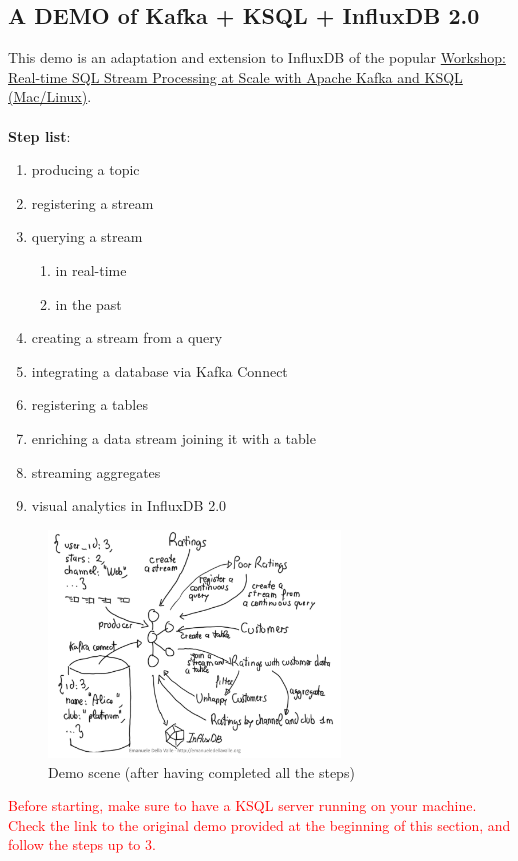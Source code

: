 \documentclass[10pt,a4paper]{article}
\newcommand{\nline}{\\~\\}
\begin{document}
\subsection{A DEMO of
Kafka + KSQL + InfluxDB 2.0}
This demo is an adaptation and extension to InfluxDB of the popular
\href{https://github.com/confluentinc/demo-scene/blob/master/ksql-workshop/ksql-workshop.adoc}{Workshop: Real-time SQL Stream Processing at Scale with
Apache Kafka and KSQL (Mac/Linux)}.
\nline
\textbf{Step list}:
\begin{enumerate}
    \item producing a topic
    \item registering a stream
    \item querying a stream
    \begin{enumerate}
         \item in real-time
         \item in the past
    \end{enumerate}     
    \item creating a stream from a query
    \item integrating a database via Kafka Connect
    \item registering a tables
    \item enriching a data stream joining it with a table
    \item streaming aggregates
    \item visual analytics in InfluxDB 2.0
\end{enumerate}
  \begin{figure}[ht!]
 \hfill \includegraphics[width=220pt]{images/ksql-demo-scene}\hspace*{\fill}
 \caption{Demo scene (after having completed all the steps)}
 \end{figure} 
 \pagebreak
  \textcolor{red}{Before starting, make sure to have a KSQL server running on your machine. Check the link to the original demo provided at the beginning of this section, and follow the steps up to 3.} \nline
\end{document}
